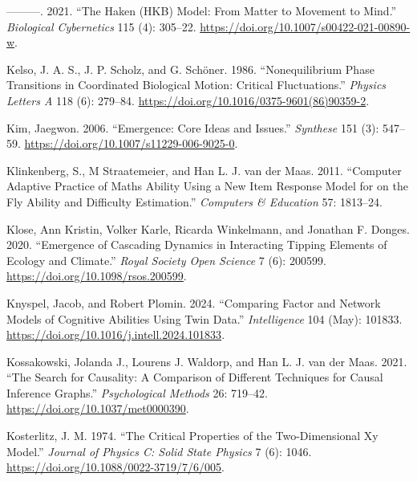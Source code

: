 \documentclass[
  a4paper,
  DIV=11,
  numbers=noendperiod,
  oneside]{scrreprt}
\newlength{\cslhangindent}
\newenvironment{CSLReferences}[2] %
 {\begin{list}{}{%
  \setlength{\itemindent}{0pt}
  \setlength{\leftmargin}{0pt}
  \setlength{\parsep}{0pt}
  \ifodd #1
   \setlength{\leftmargin}{\cslhangindent}
   \setlength{\itemindent}{-1\cslhangindent}
  \fi
  \setlength{\itemsep}{#2\baselineskip}}}
 {\end{list}}
\begin{document}
\begin{CSLReferences}{1}{0}
---------. 2021. {``The {Haken}
({HKB}) Model: From Matter to Movement to Mind.''} \emph{Biological
Cybernetics} 115 (4): 305--22.
\url{https://doi.org/10.1007/s00422-021-00890-w}.

Kelso, J. A. S., J. P. Scholz, and G. Schöner. 1986. {``Nonequilibrium
Phase Transitions in Coordinated Biological Motion: Critical
Fluctuations.''} \emph{Physics Letters A} 118 (6): 279--84.
\url{https://doi.org/10.1016/0375-9601(86)90359-2}.

Kim, Jaegwon. 2006. {``Emergence: {Core} Ideas and Issues.''}
\emph{Synthese} 151 (3): 547--59.
\url{https://doi.org/10.1007/s11229-006-9025-0}.

Klinkenberg, S., M Straatemeier, and Han L. J. van der Maas. 2011.
{``Computer Adaptive Practice of {Maths} Ability Using a New Item
Response Model for on the Fly Ability and Difficulty Estimation.''}
\emph{Computers \& Education} 57: 1813--24.

Klose, Ann Kristin, Volker Karle, Ricarda Winkelmann, and Jonathan F.
Donges. 2020. {``Emergence of Cascading Dynamics in Interacting Tipping
Elements of Ecology and Climate.''} \emph{Royal Society Open Science} 7
(6): 200599. \url{https://doi.org/10.1098/rsos.200599}.

Knyspel, Jacob, and Robert Plomin. 2024. {``Comparing Factor and Network
Models of Cognitive Abilities Using Twin Data.''} \emph{Intelligence}
104 (May): 101833. \url{https://doi.org/10.1016/j.intell.2024.101833}.

Kossakowski, Jolanda J., Lourens J. Waldorp, and Han L. J. van der Maas.
2021. {``The Search for Causality: {A} Comparison of Different
Techniques for Causal Inference Graphs.''} \emph{Psychological Methods}
26: 719--42. \url{https://doi.org/10.1037/met0000390}.

Kosterlitz, J. M. 1974. {``The Critical Properties of the
Two-Dimensional Xy Model.''} \emph{Journal of Physics C: Solid State
Physics} 7 (6): 1046. \url{https://doi.org/10.1088/0022-3719/7/6/005}.


\end{CSLReferences}
\end{document}
